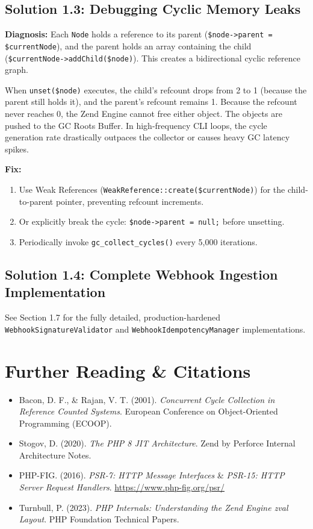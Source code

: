 \subsection{Solution 1.3: Debugging Cyclic Memory Leaks}
\textbf{Diagnosis:} Each \texttt{Node} holds a reference to its parent (\texttt{\$node->parent = \$currentNode}), and the parent holds an array containing the child (\texttt{\$currentNode->addChild(\$node)}). This creates a bidirectional cyclic reference graph. 

When \texttt{unset(\$node)} executes, the child's refcount drops from 2 to 1 (because the parent still holds it), and the parent's refcount remains 1. Because the refcount never reaches 0, the Zend Engine cannot free either object. The objects are pushed to the GC Roots Buffer. In high-frequency CLI loops, the cycle generation rate drastically outpaces the collector or causes heavy GC latency spikes.

\textbf{Fix:}
\begin{enumerate}
  \item Use Weak References (\texttt{WeakReference::create(\$currentNode)}) for the child-to-parent pointer, preventing refcount increments.
  \item Or explicitly break the cycle: \texttt{\$node->parent = null;} before unsetting.
  \item Periodically invoke \texttt{gc\_collect\_cycles()} every 5,000 iterations.
\end{enumerate}

\subsection{Solution 1.4: Complete Webhook Ingestion Implementation}
See Section 1.7 for the fully detailed, production-hardened \texttt{WebhookSignatureValidator} and \texttt{WebhookIdempotencyManager} implementations.

\section{Further Reading \& Citations}

\begin{itemize}[leftmargin=15pt]
  \item Bacon, D. F., \& Rajan, V. T. (2001). \textit{Concurrent Cycle Collection in Reference Counted Systems}. European Conference on Object-Oriented Programming (ECOOP).
  \item Stogov, D. (2020). \textit{The PHP 8 JIT Architecture}. Zend by Perforce Internal Architecture Notes.
  \item PHP-FIG. (2016). \textit{PSR-7: HTTP Message Interfaces} \& \textit{PSR-15: HTTP Server Request Handlers}. \url{https://www.php-fig.org/psr/}
  \item Turnbull, P. (2023). \textit{PHP Internals: Understanding the Zend Engine zval Layout}. PHP Foundation Technical Papers.
\end{itemize}
